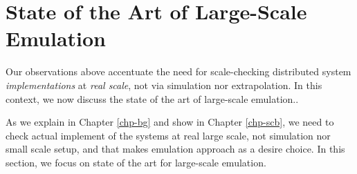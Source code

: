 %



\section{State of the Art of Large-Scale Emulation}
\label{mot-state}

Our observations above accentuate the need for scale-checking distributed
system {\em implementations} at {\em real scale}, not via simulation nor
extrapolation. In this context, we now discuss the state of the art of
large-scale emulation..

As we explain in Chapter \ref{chp-bg} and show in Chapter \ref{chp-scb}, we need
to check actual implement of the systems at real large scale, not simulation nor
small scale setup, and that makes emulation approach as a desire choice. In this
section, we focus on state of the art for large-scale emulation.
\fi


